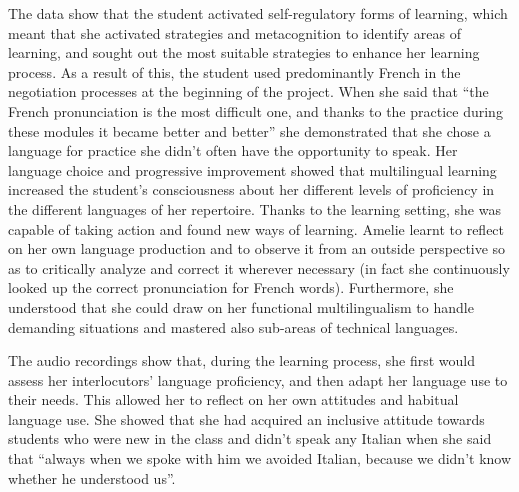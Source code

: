 \documentclass[output=paper]{../langscibook}
\begin{document}
The data show that the student activated self-regulatory forms of learning, which meant that she activated strategies and metacognition to identify areas of learning, and sought out the most suitable strategies to enhance her learning process. As a result of this, the student used predominantly French in the negotiation processes at the beginning of the project. When she said that “the French pronunciation is the most difficult one, and thanks to the practice during these modules it became better and better” she demonstrated that she chose a language for practice she didn’t often have the opportunity to speak. Her language choice and progressive improvement showed that multilingual learning increased the student’s consciousness about her different levels of proficiency in the different languages of her repertoire. Thanks to the learning setting, she was capable of taking action and found new ways of learning. Amelie learnt to reflect on her own language production and to observe it from an outside perspective so as to critically analyze and correct it wherever necessary (in fact she continuously looked up the correct pronunciation for French words). Furthermore, she understood that she could draw on her functional multilingualism to handle demanding situations and mastered also sub-areas of technical languages.  

The audio recordings show that, during the learning process, she first would assess her interlocutors’ language proficiency, and then adapt her language use to their needs. This allowed her to reflect on her own attitudes and habitual language use. She showed that she had acquired an inclusive attitude towards students who were new in the class and didn’t speak any Italian when she said that “always when we spoke with him we avoided Italian, because we didn’t know whether he understood us”. 
\end{document}
